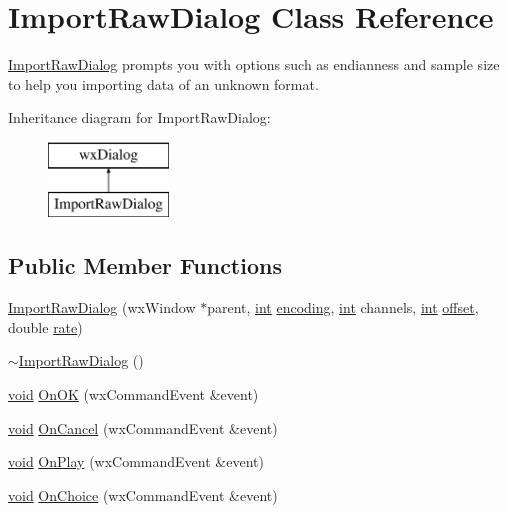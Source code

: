 \hypertarget{class_import_raw_dialog}{}\section{Import\+Raw\+Dialog Class Reference}
\label{class_import_raw_dialog}


\hyperlink{class_import_raw_dialog}{Import\+Raw\+Dialog} prompts you with options such as endianness and sample size to help you importing data of an unknown format.  


Inheritance diagram for Import\+Raw\+Dialog\+:\begin{figure}[H]
\begin{center}
\leavevmode
\includegraphics[height=2.000000cm]{class_import_raw_dialog}
\end{center}
\end{figure}
\subsection*{Public Member Functions}
\begin{DoxyCompactItemize}
\item 
\hyperlink{class_import_raw_dialog_a1c4aae7e716d270d615ec9efb0fc4035}{Import\+Raw\+Dialog} (wx\+Window $\ast$parent, \hyperlink{xmltok_8h_a5a0d4a5641ce434f1d23533f2b2e6653}{int} \hyperlink{structencoding}{encoding}, \hyperlink{xmltok_8h_a5a0d4a5641ce434f1d23533f2b2e6653}{int} channels, \hyperlink{xmltok_8h_a5a0d4a5641ce434f1d23533f2b2e6653}{int} \hyperlink{layer12_8c_a33d71f23ba2052d17f0b754dc35265b0}{offset}, double \hyperlink{seqread_8c_ad89d3fac2deab7a9cf6cfc8d15341b85}{rate})
\item 
\hyperlink{class_import_raw_dialog_a348599790ba8b961ca5c926d17be4e95}{$\sim$\+Import\+Raw\+Dialog} ()
\item 
\hyperlink{sound_8c_ae35f5844602719cf66324f4de2a658b3}{void} \hyperlink{class_import_raw_dialog_a523615a6bd6d84fc3e5e31952dec7c9f}{On\+OK} (wx\+Command\+Event \&event)
\item 
\hyperlink{sound_8c_ae35f5844602719cf66324f4de2a658b3}{void} \hyperlink{class_import_raw_dialog_a00d226efeb063821823319b4a0ba1384}{On\+Cancel} (wx\+Command\+Event \&event)
\item 
\hyperlink{sound_8c_ae35f5844602719cf66324f4de2a658b3}{void} \hyperlink{class_import_raw_dialog_abbe53cabdb4a24ecd6bd14970bb1ccb8}{On\+Play} (wx\+Command\+Event \&event)
\item 
\hyperlink{sound_8c_ae35f5844602719cf66324f4de2a658b3}{void} \hyperlink{class_import_raw_dialog_af9bf3ccb98309994eda76e1b6cb16b29}{On\+Choice} (wx\+Command\+Event \&event)
\end{DoxyCompactItemize}
